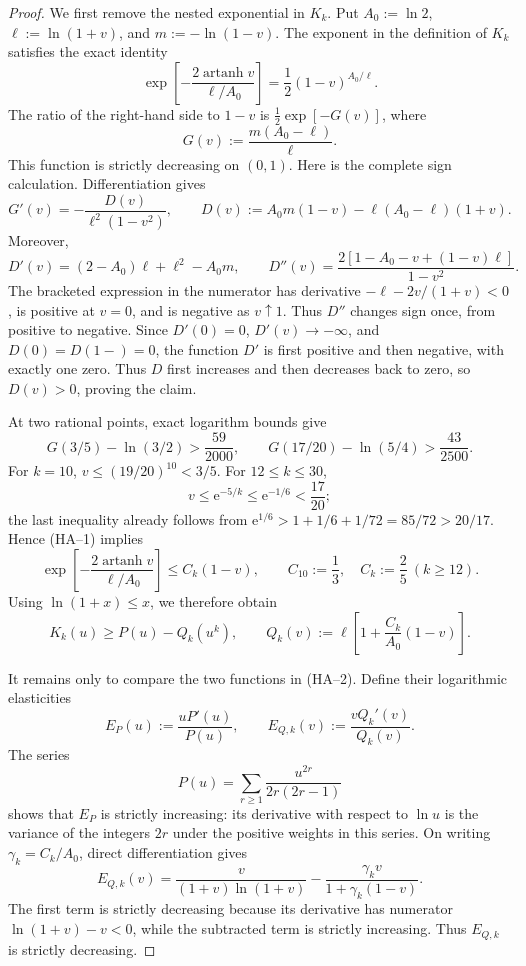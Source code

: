 \documentclass[11pt]{article}
\theoremstyle{definition}
\begin{document}
\begin{proof}
We first remove the nested exponential in \(K_k\).  Put
\(A_0:=\ln2\), \(\ell:=\ln(1+v)\), and \(m:=-\ln(1-v)\).  The exponent
in the definition of \(K_k\) satisfies the exact identity
\[
 \exp\!\left[-\frac{2\operatorname{artanh}v}{\ell/A_0}\right]
 =\frac12(1-v)^{A_0/\ell}.
\]
The ratio of the right-hand side to \(1-v\) is
\(\frac12\exp[-G(v)]\), where
\[
 G(v):=\frac{m(A_0-\ell)}{\ell}.
\]
This function is strictly decreasing on \((0,1)\).  Here is the complete
sign calculation.  Differentiation gives
\[
 G'(v)=-\frac{D(v)}{\ell^2(1-v^2)},\qquad
 D(v):=A_0m(1-v)-\ell(A_0-\ell)(1+v).
\]
Moreover,
\[
 D'(v)=(2-A_0)\ell+\ell^2-A_0m,
 \qquad
 D''(v)=
 \frac{2[1-A_0-v+(1-v)\ell]}{1-v^2}.
\]
The bracketed expression in the numerator has derivative
\(-\ell-2v/(1+v)<0\), is positive at \(v=0\), and is negative as
\(v\uparrow1\).  Thus \(D''\) changes sign once, from positive to
negative.  Since \(D'(0)=0\), \(D'(v)\to-\infty\), and
\(D(0)=D(1-)=0\), the function \(D'\) is first positive and then
negative, with exactly one zero.  Thus \(D\) first increases and then
decreases back to zero, so \(D(v)>0\), proving the claim.

At two rational points, exact logarithm bounds give
\[
 G(3/5)-\ln(3/2)>\frac{59}{2000},
 \qquad
 G(17/20)-\ln(5/4)>\frac{43}{2500}.        \tag{HA--1}
\]
For \(k=10\), \(v\le(19/20)^{10}<3/5\).  For \(12\le k\le30\),
\[
 v\le \mathrm e^{-5/k}\le \mathrm e^{-1/6}<\frac{17}{20};
\]
the last inequality already follows from
\(\mathrm e^{1/6}>1+1/6+1/72=85/72>20/17\).  Hence (HA--1) implies
\[
 \exp\!\left[-\frac{2\operatorname{artanh}v}{\ell/A_0}\right]
 \le C_k(1-v),\qquad
 C_{10}:=\frac13,\quad C_k:=\frac25\ (k\ge12).
\]
Using \(\ln(1+x)\le x\), we therefore obtain
\[
 K_k(u)\ge P(u)-Q_k(u^k),\qquad
 Q_k(v):=\ell\left[1+\frac{C_k}{A_0}(1-v)\right].       \tag{HA--2}
\]

It remains only to compare the two functions in (HA--2).  Define their
logarithmic elasticities
\[
 E_P(u):=\frac{uP'(u)}{P(u)},\qquad
 E_{Q,k}(v):=\frac{vQ_k'(v)}{Q_k(v)}.
\]
The series
\[
 P(u)=\sum_{r\ge1}\frac{u^{2r}}{2r(2r-1)}
\]
shows that \(E_P\) is strictly increasing: its derivative with respect
to \(\ln u\) is the variance of the integers \(2r\) under the positive
weights in this series.  On writing \(\gamma_k=C_k/A_0\), direct
differentiation gives
\[
 E_{Q,k}(v)=
 \frac{v}{(1+v)\ln(1+v)}
 -\frac{\gamma_kv}{1+\gamma_k(1-v)}.
\]
The first term is strictly decreasing because its derivative has
numerator \(\ln(1+v)-v<0\), while the subtracted term is strictly
increasing.  Thus \(E_{Q,k}\) is strictly decreasing.


\end{proof}
\end{document}
